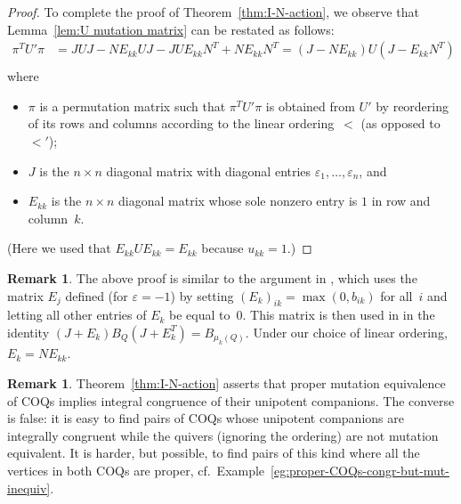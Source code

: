 \documentclass[11pt, letterpaper]{amsart}
\theoremstyle{definition}
\newtheorem{remark}[theorem]{Remark}
\numberwithin{equation}{section}
\begin{document}
\begin{proof}
To complete the proof of Theorem~\ref{thm:I-N-action}, we observe that
Lemma~\ref{lem:U mutation matrix} can be restated as follows: 
\begin{align*}
\pi^T U' \pi &= J U J - N E_{kk} U J - J U E_{kk} N^T + N E_{kk} N^T = (J - N E_{kk}) U (J - E_{kk} N^T)
\\[-20pt]
\end{align*}
where 
\begin{itemize}
\item 
$\pi$ is a permutation matrix such that 
$\pi^T U' \pi$ is obtained from $U'$ by reordering of its rows and columns according to the linear ordering~$<$
(as opposed to~$<'$); 
\item $J$ is the $n \times n$ diagonal matrix with diagonal entries $\varepsilon_1,\dots,\varepsilon_n$, and 
\item $E_{kk}$ is the $n \times n$ diagonal matrix whose sole nonzero entry is $1$ in row and column~$k$. 
\end{itemize}
(Here we used that $E_{kk} U E_{kk} = E_{kk}$ because $u_{kk}=1$.)
\end{proof}

\begin{remark}
\label{rem:U mutates like B}
The above proof is similar to the argument in \cite[p.~34]{fwz1-3}, which uses 
the matrix $E_j$ defined (for $\varepsilon=-1$) by setting $(E_k)_{ik} = \max(0, b_{ik})$ 
for all~$i$ and letting all other entries of $E_k$ be equal to~$0$.
This matrix is then used in \cite{fwz1-3} in the identity $(J + E_k) B_Q (J + E_k^T) = B_{\mu_k(Q)}$. 
Under our choice of linear ordering, $E_k = N E_{kk}$.
\end{remark}

\begin{remark}
Theorem~\ref{thm:I-N-action} asserts that proper mutation equivalence of COQs
implies integral congruence of their unipotent companions. 
The converse is false: 
it is easy to find pairs of COQs whose unipotent companions are integrally congruent 
while the quivers (ignoring the ordering) are not mutation equivalent. 
It is harder, but possible, to find pairs of this kind where all the vertices in both COQs are proper,
cf.\ Example~\ref{eg:proper-COQs-congr-but-mut-inequiv}. 
\end{remark}

\medskip

\end{document}
